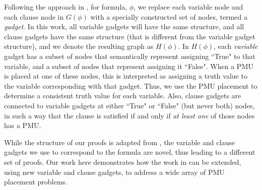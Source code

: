Following the approach in \cite{Brueni05}, for \sat formula, $\phi$, we replace each variable node and each clause node in $G(\phi)$ with a specially constructed set of nodes,
termed a {\em gadget}. In this work, all variable gadgets will have the same structure, and all clause gadgets have the same structure (that is different from the variable gadget structure), 
and we denote the resulting graph as $H(\phi)$. In $H(\phi)$, each {\em variable} gadget has a subset of nodes that semantically represent assigning ``True" to that variable, and a subset of 
nodes that represent assigning it ``False". When a PMU is placed at one of these nodes, this is interpreted as assigning a truth value to the \sat variable corresponding with that gadget. 
Thus, we use the PMU placement to determine a consistent truth value for each \sat variable. Also, clause gadgets are connected to variable gadgets at either ``True" or ``False" (but never both) 
nodes, in such a way that the clause is satisfied if and only if {\em at least one} of those nodes has a PMU.



While the structure of our proofs is adapted from \cite{Brueni05}, the variable and clause gadgets we use to correspond to the \sat formula are novel, thus leading to a 
different set of proofs. Our work here demonstrates how the work in \cite{Brueni05} can be extended, using new variable and clause gadgets, to address a wide array of PMU placement problems.

